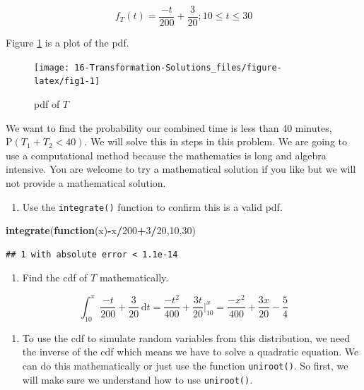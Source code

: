 \documentclass[
]{book}
\newenvironment{Shaded}{\begin{snugshade}}{\end{snugshade}}
\newcommand{\ControlFlowTok}[1]{\textcolor[rgb]{0.13,0.29,0.53}{\textbf{#1}}}
\newcommand{\DecValTok}[1]{\textcolor[rgb]{0.00,0.00,0.81}{#1}}
\newcommand{\KeywordTok}[1]{\textcolor[rgb]{0.13,0.29,0.53}{\textbf{#1}}}
\newcommand{\NormalTok}[1]{#1}
\newcommand{\OperatorTok}[1]{\textcolor[rgb]{0.81,0.36,0.00}{\textbf{#1}}}
\providecommand{\tightlist}{%
  \setlength{\itemsep}{0pt}\setlength{\parskip}{0pt}}
\begin{document}
\[
f_T(t)= \frac{-t}{200}+\frac{3}{20}; 10 \leq t \leq30
\]

Figure \ref{fig:fig1} is a plot of the pdf.

\begin{figure}

{\centering \texttt{[image: 16-Transformation-Solutions\_files/figure-latex/fig1-1]} 

}

\caption{pdf of $T$}\label{fig:fig1}
\end{figure}

We want to find the probability our combined time is less than 40 minutes, \(\mbox{P}(T_1 + T_2 < 40)\). We will solve this in steps in this problem. We are going to use a computational method because the mathematics is long and algebra intensive. You are welcome to try a mathematical solution if you like but we will not provide a mathematical solution.

\begin{enumerate}
\def\labelenumi{\alph{enumi}.}
\tightlist
\item
  Use the \texttt{integrate()} function to confirm this is a valid pdf.
\end{enumerate}

\begin{Shaded}
\begin{Highlighting}[]
\KeywordTok{integrate}\NormalTok{(}\ControlFlowTok{function}\NormalTok{(x)}\OperatorTok{-}\NormalTok{x}\OperatorTok{/}\DecValTok{200}\OperatorTok{+}\DecValTok{3}\OperatorTok{/}\DecValTok{20}\NormalTok{,}\DecValTok{10}\NormalTok{,}\DecValTok{30}\NormalTok{)}
\end{Highlighting}
\end{Shaded}

\begin{verbatim}
## 1 with absolute error < 1.1e-14
\end{verbatim}

\begin{enumerate}
\def\labelenumi{\alph{enumi}.}
\setcounter{enumi}{1}
\tightlist
\item
  Find the cdf of \(T\) mathematically.
\end{enumerate}

\[
\int_{10}^{x} \frac{-t}{200}+\frac{3}{20} \,\mathrm{d}t = \frac{-t^2}{400}+\frac{3t}{20}\bigg|_{10}^x = \frac{-x^2}{400}+\frac{3x}{20} - \frac{5}{4} 
\]

\begin{enumerate}
\def\labelenumi{\alph{enumi}.}
\setcounter{enumi}{2}
\tightlist
\item
  To use the cdf to simulate random variables from this distribution, we need the inverse of the cdf which means we have to solve a quadratic equation. We can do this mathematically or just use the function \texttt{uniroot()}. So first, we will make sure we understand how to use \texttt{uniroot()}.
\end{enumerate}
\end{document}
